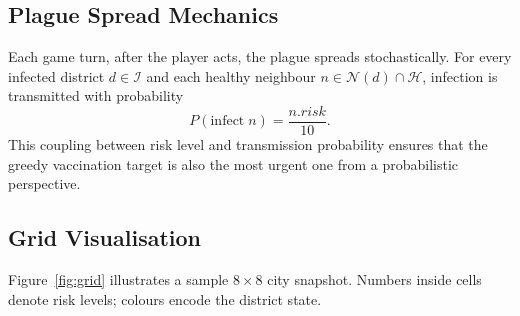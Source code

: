\documentclass[conference]{IEEEtran}
\begin{document}
\subsection{Plague Spread Mechanics}

Each game turn, after the player acts, the plague spreads stochastically. For every
infected district $d \in \mathcal{I}$ and each healthy neighbour
$n \in \mathcal{N}(d) \cap \mathcal{H}$, infection is transmitted with probability
\[
  P(\text{infect}\;n) = \frac{n.\mathit{risk}}{10}.
\]
This coupling between risk level and transmission probability ensures that the
greedy vaccination target is also the most urgent one from a probabilistic
perspective.

\subsection{Grid Visualisation}

Figure~\ref{fig:grid} illustrates a sample $8\times8$ city snapshot. Numbers inside
cells denote risk levels; colours encode the district state.
\end{document}
